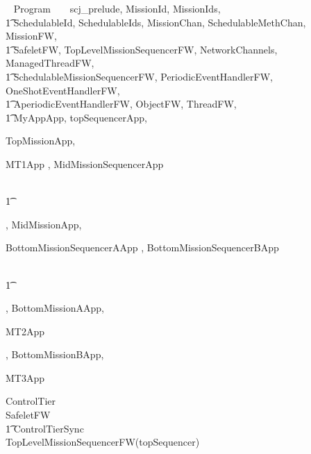 
%
\begin{zsection}
  \SECTION ~ Program ~ \parents ~ scj\_prelude, MissionId, MissionIds, \\
  \t1 SchedulableId, SchedulableIds, MissionChan, SchedulableMethChan, MissionFW,\\
  \t1 SafeletFW, TopLevelMissionSequencerFW, NetworkChannels, ManagedThreadFW, \\
  \t1 SchedulableMissionSequencerFW, PeriodicEventHandlerFW, OneShotEventHandlerFW,\\
  \t1 AperiodicEventHandlerFW, ObjectFW, ThreadFW, \\
  \t1 MyAppApp, topSequencerApp,

TopMissionApp,

MT1App
	,
MidMissionSequencerApp
	
\\ \t1
	
	,
MidMissionApp,

BottomMissionSequencerAApp
	,
BottomMissionSequencerBApp
	
\\ \t1
	
	,
BottomMissionAApp,

MT2App
	
	
	,
BottomMissionBApp,

MT3App
	
	
	
\end{zsection}
%
\begin{circus}
\circprocess ControlTier \circdef \\
\circblockopen
SafeletFW \\
\t1 \lpar ControlTierSync \rpar \\
TopLevelMissionSequencerFW(topSequencer)
\circblockclose
\end{circus}
%


